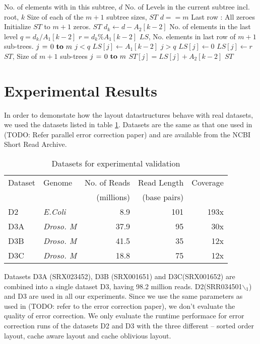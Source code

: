 \documentclass[integrals, nointegrals, article, 12pt, a4paper]{article}
\begin{document}
\begin{codebox}
\zi {} No. of elements with in this subtree, $d$
\zi {} No. of Levels in the current subtree incl. root, $k$
\zi {} Size of each of the $m+1$ subtree sizes, $ST$
\li \If $d == m$ \Comment Last row : All zeroes
\li \Do Initialize $ST$ to $m+1$ zeros.
\li     \Return $ST$ \End
\li $d_k \gets d - A_2[k - 2]$ \Comment No. of elements in the last level
\li $q = d_k / A_1[k - 2]$
\li $r = d_k \% A_1[k - 2]$
\zi \Comment $LS$, No. elements in last row of $m+1$ sub-trees.
\li \For $j \gets 0 \To m$
\li \Do \If $j < q$
\li        \Then $LS[j] \gets A_1[k - 2]$
\li      \ElseIf $j > q$
\li        \Then $LS[j] \gets 0$
\li      \Else
\li         $LS[j] \gets r$ \End
    \End
\zi \Comment $ST$, Size of $m+1$ sub-trees
\li \For $j \gets 0 \To m$
\li \Do $ST[j] = LS[j] + A_2[k-2]$ \End
\li \Return $ST$
\end{codebox}

\section{Experimental Results}
\label{sec-2}

In order to demonstate how the layout datastructures behave with real
datasets, we used the datasets listed in table
\ref{tab:datasets}. Datasets are the same as that one used in (TODO: Refer
parallel error correction paper) and are available from the NCBI Short
Read Archive.

\begin{table}[htb]
\caption{\label{tab:datasets}Datasets for experimental validation}
\centering
\begin{tabular}{llrrr}
\hline
Dataset & Genome & No. of Reads & Read Length & Coverage\\
 &  & (millions) & (base pairs) & \\
\hline
D2 & \emph{E.Coli} & 8.9 & 101 & 193x\\
D3A & \emph{Droso. M} & 37.9 & 95 & 30x\\
D3B & \emph{Droso. M} & 41.5 & 35 & 12x\\
D3C & \emph{Droso. M} & 18.8 & 75 & 12x\\
\hline
\end{tabular}
\end{table}


Datasets D3A (SRX023452), D3B (SRX001651) and D3C(SRX001652) are
combined into a single dataset D3, having 98.2 million
reads. D2(SRR034501$\backslash$$_{\text{1}}$) and D3 are used in all our experiments. Since we
use the same parameters as used in (TODO: refer to the error correction
paper), we don't evaluate the quality of error correction. We only
evaluate the runtime performace for error correction runs of the
datasets D2 and D3 with the three different -- sorted order layout,
cache aware layout and cache oblivious layout.
\end{document}
